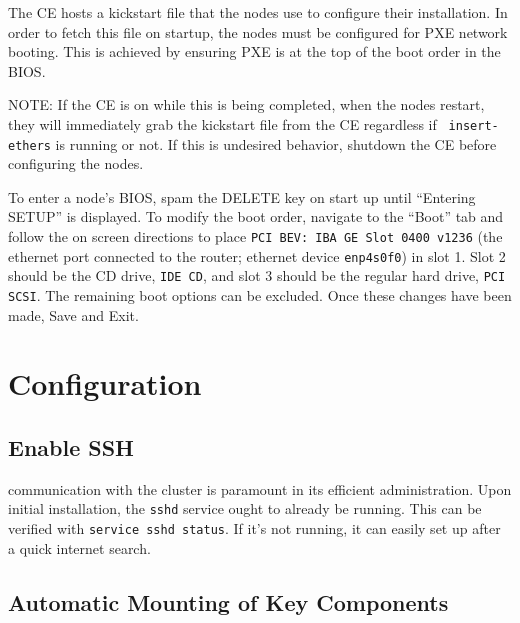\documentclass[12pt]{article}
\begin{document}
\qq The CE hosts a kickstart file that the nodes use to configure their
installation. In order to fetch this file on startup, the nodes must be
configured for PXE network booting. This is achieved by ensuring PXE is at the
top of the boot order in the BIOS.

\qq NOTE: If the CE is on while this is being completed, when the nodes restart,
they will immediately grab the kickstart file from the CE regardless if {\tt
  insert-ethers} is running or not. If this is undesired behavior, shutdown the
CE before configuring the nodes.

\qq To enter a node's BIOS, spam the DELETE key on start up until ``Entering
SETUP'' is displayed. To modify the boot order, navigate to the ``Boot'' tab and
follow the on screen directions to place {\tt PCI BEV: IBA GE Slot 0400 v1236}
(the ethernet port connected to the router; ethernet device {\tt enp4s0f0}) in
slot 1. Slot 2 should be the CD drive, {\tt IDE CD}, and slot 3 should be the
regular hard drive, {\tt PCI SCSI}. The remaining boot options can be
excluded. Once these changes have been made, Save and Exit.





\section{Configuration}

\subsection{Enable SSH}

 communication with the cluster is paramount in its efficient
administration. Upon initial installation, the {\tt sshd} service ought to
already be running. This can be verified with {\tt service sshd status}. If it's
not running, it can easily set up after a quick internet search.

\subsection{Automatic Mounting of Key Components}




\end{document}
